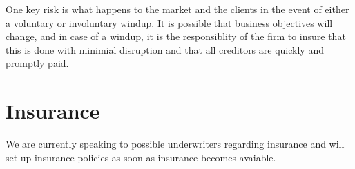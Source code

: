 One key risk is what happens to the market and the clients in the
event of either a voluntary or involuntary windup.  It is possible
that business objectives will change, and in case of a windup, it is
the responsiblity of the firm to insure that this is done with
minimial disruption and that all creditors are quickly and promptly
paid.

\section{Insurance}

We are currently speaking to possible underwriters regarding insurance
and will set up insurance policies as soon as insurance becomes
avaiable.

